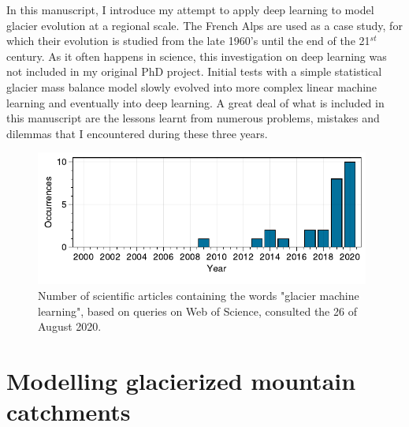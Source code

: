 In this manuscript, I introduce my attempt to apply deep learning to model glacier evolution at a regional scale. The French Alps are used as a case study, for which their evolution is studied from the late 1960's until the end of the 21$^{st}$ century. As it often happens in science, this investigation on deep learning was not included in my original PhD project. Initial tests with a simple statistical glacier mass balance model slowly evolved into more complex linear machine learning and eventually into deep learning. A great deal of what is included in this manuscript are the lessons learnt from numerous problems, mistakes and dilemmas that I encountered during these three years. 

\begin{figure}[h]
\centering
\includegraphics[width=11cm]{Figures/intro/Figure_4.pdf}
\caption{Number of scientific articles containing the words "glacier machine learning", based on queries on Web of Science, consulted the 26 of August 2020.}
\label{intro:fig4}
\end{figure} 

\section{Modelling glacierized mountain catchments}

